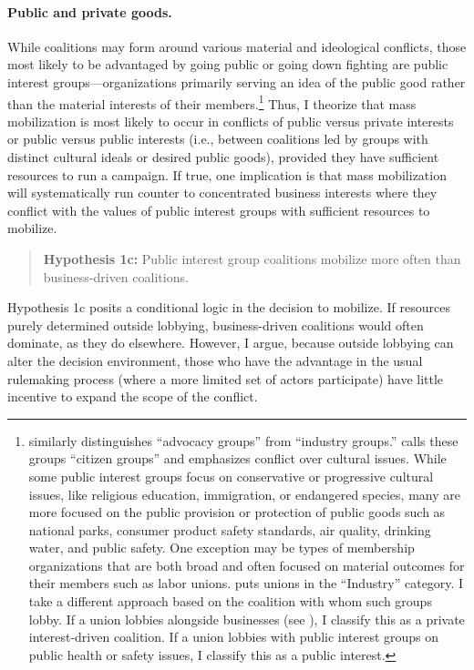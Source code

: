 \documentclass[
      12pt,
        ]{article}
\begin{document}
\hypertarget{public-and-private-goods.}{%
\paragraph{Public and private goods.}\label{public-and-private-goods.}}

While coalitions may form around various material and ideological
conflicts, those most likely to be advantaged by going public or going
down fighting are public interest groups---organizations primarily
serving an idea of the public good rather than the material interests of
their members.\footnote{\citet{Potter2017} similarly distinguishes ``advocacy groups'' from
  ``industry groups.'' \citet{Berry1999} calls these groups ``citizen groups''
  and emphasizes conflict over cultural issues. While some public
  interest groups focus on conservative or progressive cultural
  issues, like religious education, immigration, or endangered
  species, many are more focused on the public provision or protection
  of public goods such as national parks, consumer product safety
  standards, air quality, drinking water, and public safety.
  One exception may be types of membership organizations that are both
  broad and often focused on material outcomes for their members such
  as labor unions. \citet{Potter2017} puts unions in the ``Industry'' category.
  I take a different approach based on the coalition with whom such
  groups lobby. If a union lobbies alongside businesses (see \citet{Mildenberger2020}), I classify
  this as a private interest-driven coalition. If a union lobbies with
  public interest groups on public health or safety issues, I classify
  this as a public interest.} Thus, I theorize that mass mobilization is most
likely to occur in conflicts of public versus private interests or
public versus public interests (i.e., between coalitions led by groups
with distinct cultural ideals or desired public goods), provided they
have sufficient resources to run a campaign. If true, one implication is
that mass mobilization will systematically run counter to concentrated
business interests where they conflict with the values of public
interest groups with sufficient resources to mobilize.



\begin{quote}
\textbf{Hypothesis 1c:} Public interest group coalitions mobilize more often than
business-driven coalitions.
\end{quote}

Hypothesis 1c posits a conditional logic in the
decision to mobilize. If resources purely determined outside lobbying,
business-driven coalitions would often dominate, as they do elsewhere.
However, I argue, because outside lobbying can alter the decision
environment, those who have the advantage in the usual rulemaking
process (where a more limited set of actors participate) have little
incentive to expand the scope of the conflict.
\end{document}

